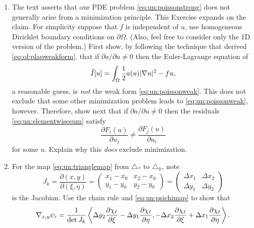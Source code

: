 \renewcommand{\labelenumi}{\arabic{chapter}.\arabic{enumi}\quad}
\renewcommand{\labelenumii}{(\alph{enumii})}
\begin{enumerate}
\item \label{exer:un:notminimization}  The text asserts that our PDE problem \eqref{eq:un:poissonstrong} does not generally arise from a minimization principle.  This Exercise expands on the claim.  For simplicity suppose that $f$ is independent of $u$, use homogeneous Dirichlet boundary conditions on $\partial \Omega$.  (Also, feel free to consider only the 1D version of the problem.)  First show, by following the technique that derived \eqref{eq:of:plapweakform}, that if $\partial a/\partial u \ne 0$ then the Euler-Lagrange equation of
\begin{equation}
  \tilde I[u] = \int_\Omega \frac{1}{2} a(u) |\nabla u|^2 - f u,  \label{eq:un:nottheobjective}
\end{equation}
a reasonable guess, is \emph{not} the weak form \eqref{eq:un:poissonweak}.  This does not exclude that some other minimization problem leads to \eqref{eq:un:poissonweak}, however.  Therefore, show next that if $\partial a/\partial u \ne 0$ then the residuals \eqref{eq:un:elementwisesum} satisfy
\begin{equation}
  \frac{\partial F_i(u)}{\partial u_j} \ne \frac{\partial F_j(u)}{\partial u_i} \label{eq:un:symmetryresidualsdonthave}
\end{equation}
for some $u$.  Explain why this \emph{does} exclude minimization.
\item  \label{exer:un:gradientdetails}  For the map \eqref{eq:un:trianglemap} from $\triangle_\ast$ to $\triangle_k$, note
    $$J_k = \frac{\partial (x,y)}{\partial (\xi,\eta)} = \begin{pmatrix}
    x_1 - x_0 & x_2 - x_0 \\
    y_1 - y_0 & y_2 - y_0 \end{pmatrix}
    = \begin{pmatrix}
    \Delta x_1 & \Delta x_2 \\
    \Delta y_1 & \Delta y_2
    \end{pmatrix}$$
is the Jacobian.  Use the chain rule and \eqref{eq:un:psichimap} to show that
\begin{equation}
\grad_{x,y} \psi_i = \frac{1}{\det J_k} \left<\Delta y_2 \frac{\partial \chi_\ell}{\partial \xi} - \Delta y_1 \frac{\partial \chi_\ell}{\partial \eta}, - \Delta x_2 \frac{\partial \chi_\ell}{\partial \xi} + \Delta x_1 \frac{\partial \chi_\ell}{\partial \eta}\right>. \label{eq:un:gradpsionref}

\end{equation}
\end{enumerate}
